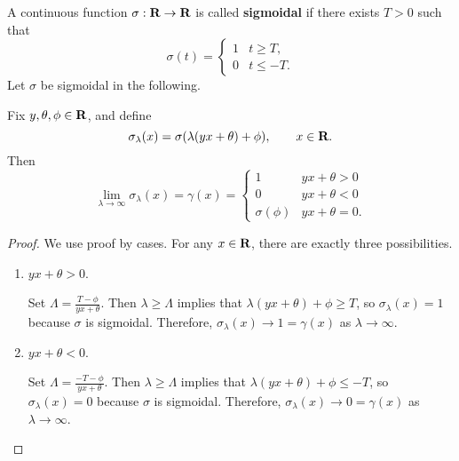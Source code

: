 \documentclass{homework}
\begin{document}
	\maketitle
	
	\question
	
	A continuous function $\sigma : \textbf{R} \to \textbf{R}$ is called \textbf{sigmoidal} if there exists $T > 0$ such that
	\begin{equation}
		\sigma(t) = \begin{cases}
			1 & t \ge T, \\
			0 & t \le -T.
		\end{cases}
	\end{equation}
	Let $\sigma$ be sigmoidal in the following.
	
	\begin{arabicparts}
		\questionpart
		Fix $y, \theta, \phi \in \textbf{R}$, and define
		\begin{equation}
			\label{eq:sigma_lambda_def}
			\sigma_\lambda(x) = \sigma(\lambda(yx + \theta) + \phi), \qquad x \in \textbf{R}.
		\end{equation}
		Then
		\begin{equation}
			\lim_{\lambda\to\infty}\sigma_\lambda(x) = \gamma(x) = \begin{cases}
				1 & yx + \theta > 0 \\
				0 & yx + \theta < 0 \\
				\sigma(\phi) & yx + \theta = 0.
			\end{cases}
		\end{equation}
		\begin{proof}
			We use proof by cases. For any $x \in \textbf{R}$, there are exactly three possibilities.
			\begin{enumerate}[label=\Roman*.]
				\item $yx + \theta > 0$.
				
				Set $\Lambda = \frac{T-\phi}{yx + \theta}$. Then $\lambda \ge \Lambda$ implies that $\lambda(yx+\theta) + \phi \ge T$, so $\sigma_\lambda(x) = 1$ because $\sigma$ is sigmoidal. Therefore, $\sigma_\lambda(x) \to 1 = \gamma(x)$ as $\lambda \to\infty$.
				
				\item $yx + \theta < 0$.
				
				Set $\Lambda = \frac{-T-\phi}{yx+\theta}$. Then $\lambda \ge \Lambda$ implies that $\lambda(yx+\theta) + \phi \le -T$, so $\sigma_\lambda(x) = 0$ because $\sigma$ is sigmoidal. Therefore, $\sigma_\lambda(x) \to 0 = \gamma(x)$ as $\lambda \to \infty$.
				

\end{enumerate}
\end{proof}
\end{arabicparts}
\end{document}
